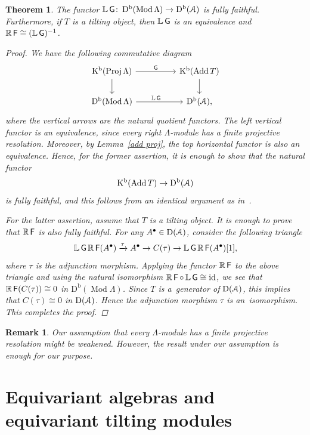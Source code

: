 \documentclass[11pt]{article}
\numberwithin{equation}{section}
\newtheorem{rem}[dfn]{Remark}
\newtheorem{thm}[dfn]{Theorem}
\numberwithin{equation}{section}
\newcommand{\Mod}{\operatorname{Mod}}
\newcommand{\Proj}{\operatorname{Proj}}
\newcommand{\Add}{\operatorname{Add}}
\newcommand{\Db}{\operatorname{D^b}}
\newcommand{\D}{\operatorname{D}}
\newcommand{\Kb}{\operatorname{K^b}}
\newcommand{\id}{\operatorname{id}}
\newcommand{\bL}{\mathbb{L}}
\newcommand{\bR}{\mathbb{R}}
\newcommand{\scrA}{\EuScript{A}}
\newcommand{\F}{\operatorname{\sf{F}}}
\newcommand{\G}{\operatorname{\sf{G}}}
\begin{document}
\begin{thm}\label{general tilting}
The functor $\bL \G\colon \Db(\Mod\Lambda)\to\Db(\scrA)$
is fully faithful. Furthermore, if $T$ is a tilting object, then $\bL \G$ is an equivalence and $\bR \F\cong (\bL \G)^{-1}$.
\begin{proof}
 We have the following commutative diagram
\[
\begin{tikzcd}
\Kb(\Proj\Lambda)\arrow[rr,"\G"]\arrow[d,]&&\Kb(\Add T)\arrow[d,]\\
\Db(\Mod\Lambda)\arrow[rr, "\bL \G\,\,\,\,\,\,"]&&\Db(\scrA),
\end{tikzcd}
\]
where the vertical arrows are the natural quotient functors. The left vertical functor is an equi\-va\-lence, since every right $\Lambda$-module has a finite projective resolution. Moreover, by Lemma~\ref{add proj}, the top horizontal functor is also an equivalence. Hence, for the former assertion, it is enough to show that the natural functor
\begin{gather*}
\Kb(\Add T)\to \Db(\scrA)
\end{gather*}
is fully faithful, and this follows from an identical argument as in~\cite[Chapter~III, Lemma~2.1]{happel}.

For the latter assertion, assume that $T$ is a tilting object. It is enough to prove that $\bR \F$ is also fully faithful. For any $A^{\bullet}\in \D(\scrA)$, consider the following triangle
\begin{gather*}
\bL \G \bR \F(A^{\bullet})\xrightarrow{\tau}A^{\bullet}\to C(\tau)\to \bL \G \bR \F(A^{\bullet})[1],
\end{gather*}
where $\tau$ is the adjunction morphism. Applying the functor $\bR \F$ to the above triangle and using the natural isomorphism $\bR \F\circ \,\bL \G\cong \id$, we see that $\bR \F(C(\tau))\cong 0$ in $\Db(\Mod\Lambda)$. Since $T$ is a~generator of $\D(\scrA)$, this implies that $C(\tau)\cong 0$ in $\D(\scrA)$. Hence the adjunction morphism $\tau$ is an~isomorphism. This completes the proof.
\end{proof}
\end{thm}

\begin{rem}
Our assumption that every $\Lambda$-module has a finite projective resolution might be weakened. However, the result under our assumption is enough for our purpose.
\end{rem}

\section{Equivariant algebras and equivariant tilting modules}
\end{document}
